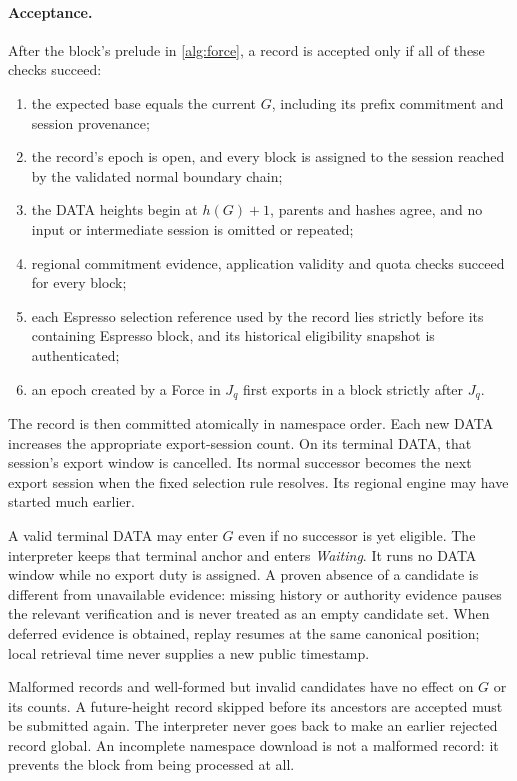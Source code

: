 \documentclass[11pt,a4paper]{article}
\newcommand{\defterm}[1]{\textcolor{rrBlue}{\textit{#1}}}
\begin{document}
\paragraph{Acceptance.}
After the block's prelude in \cref{alg:force}, a record is accepted
only if all of these checks succeed:
\begin{enumerate}[label=(\roman*)]
\item the expected base equals the current $G$, including its prefix
commitment and session provenance;
\item the record's epoch is open, and every block is assigned to the
session reached by the validated normal boundary chain;
\item the DATA heights begin at $h(G)+1$, parents and hashes agree,
and no input or intermediate session is omitted or repeated;
\item regional commitment evidence, application validity and quota
checks succeed for every block;
\item each Espresso selection reference used by the record lies
strictly before its containing Espresso block, and its historical
eligibility snapshot is authenticated;
\item an epoch created by a Force in $J_q$ first exports in a block
strictly after $J_q$.
\end{enumerate}
The record is then committed atomically in namespace order.
Each new DATA increases the appropriate export-session count. On its
terminal DATA, that session's export window is cancelled. Its normal
successor becomes the next export session when the fixed selection
rule resolves. Its regional engine may have started much earlier.

A valid terminal DATA may enter $G$ even if no successor is yet
eligible. The interpreter keeps that terminal anchor and enters
\defterm{Waiting}. It runs no DATA window while no export duty is
assigned. A proven absence of a candidate is different from unavailable
evidence: missing history or authority evidence pauses the relevant
verification and is never treated as an empty candidate set.
When deferred evidence is obtained, replay resumes at the same canonical
position; local retrieval time never supplies a new public timestamp.

Malformed records and well-formed but invalid candidates have no
effect on $G$ or its counts. A future-height record skipped before its
ancestors are accepted must be submitted again. The interpreter never
goes back to make an earlier rejected record global. An incomplete
namespace download is not a malformed record: it prevents the block
from being processed at all.
\end{document}
